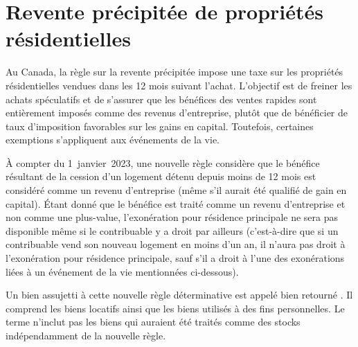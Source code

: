 \section{Revente précipitée de propriétés résidentielles}
\begin{intro}
	Au Canada, la règle sur la revente précipitée impose une taxe sur les propriétés résidentielles vendues dans les 12 mois suivant l'achat. L'objectif est de freiner les achats spéculatifs et de s'assurer que les bénéfices des ventes rapides sont entièrement imposés comme des revenus d'entreprise, plutôt que de bénéficier de taux d'imposition favorables sur les gains en capital. Toutefois, certaines exemptions s'appliquent aux événements de la vie.
\end{intro}
À compter du 1\ier{}~janvier~2023, une nouvelle règle considère que le bénéfice résultant de la cession d'un logement détenu depuis moins de 12 mois est considéré comme un revenu d'entreprise (même s'il aurait été qualifié de gain en capital). Étant donné que le bénéfice est traité comme un revenu d'entreprise et non comme une plus-value, l'exonération pour résidence principale ne sera pas disponible même si le contribuable y a droit par ailleurs (c'est-à-dire que si un contribuable vend son nouveau logement en moins d'un an, il n'aura pas droit à l'exonération pour résidence principale, sauf s'il a droit à l'une des exonérations liées à un événement de la vie mentionnées ci-dessous).

Un bien assujetti à cette nouvelle règle déterminative est appelé \og bien retourné \fg{}. Il comprend les biens locatifs ainsi que les biens utilisés à des fins personnelles. Le terme n'inclut pas les biens qui auraient été traités comme des stocks indépendamment de la nouvelle règle.

